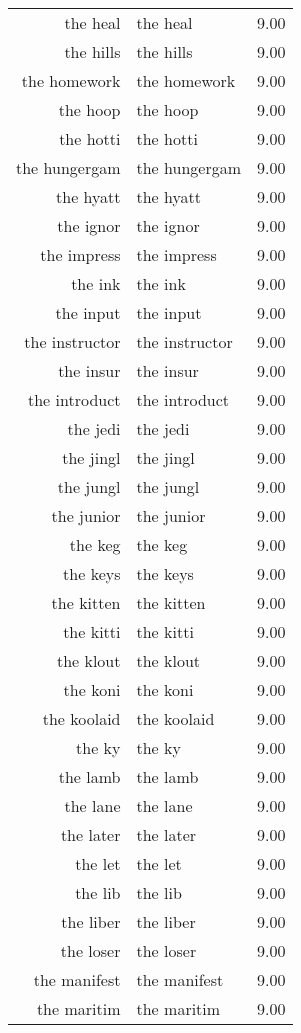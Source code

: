 \begin{table}[ht]
\begin{tabular}{rlr}
  the heal & the heal & 9.00 \\ 
  the hills & the hills & 9.00 \\ 
  the homework & the homework & 9.00 \\ 
  the hoop & the hoop & 9.00 \\ 
  the hotti & the hotti & 9.00 \\ 
  the hungergam & the hungergam & 9.00 \\ 
  the hyatt & the hyatt & 9.00 \\ 
  the ignor & the ignor & 9.00 \\ 
  the impress & the impress & 9.00 \\ 
  the ink & the ink & 9.00 \\ 
  the input & the input & 9.00 \\ 
  the instructor & the instructor & 9.00 \\ 
  the insur & the insur & 9.00 \\ 
  the introduct & the introduct & 9.00 \\ 
  the jedi & the jedi & 9.00 \\ 
  the jingl & the jingl & 9.00 \\ 
  the jungl & the jungl & 9.00 \\ 
  the junior & the junior & 9.00 \\ 
  the keg & the keg & 9.00 \\ 
  the keys & the keys & 9.00 \\ 
  the kitten & the kitten & 9.00 \\ 
  the kitti & the kitti & 9.00 \\ 
  the klout & the klout & 9.00 \\ 
  the koni & the koni & 9.00 \\ 
  the koolaid & the koolaid & 9.00 \\ 
  the ky & the ky & 9.00 \\ 
  the lamb & the lamb & 9.00 \\ 
  the lane & the lane & 9.00 \\ 
  the later & the later & 9.00 \\ 
  the let & the let & 9.00 \\ 
  the lib & the lib & 9.00 \\ 
  the liber & the liber & 9.00 \\ 
  the loser & the loser & 9.00 \\ 
  the manifest & the manifest & 9.00 \\ 
  the maritim & the maritim & 9.00 \\ 

\end{tabular}
\end{table}

